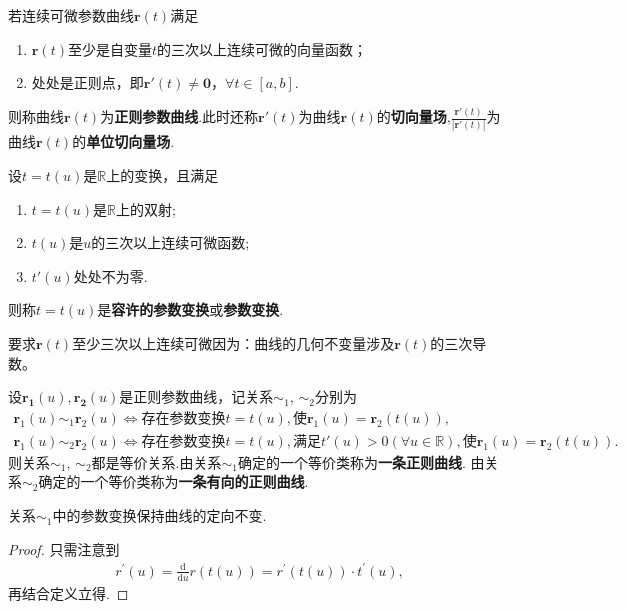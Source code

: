 \documentclass[../../main.tex]{subfiles}%
\begin{document}
\begin{definition}[正则参数曲线和参数变换]
若连续可微参数曲线$\bm{r}(t)$满足
\begin{enumerate}[(1)]
\item $\bm{r}(t)$至少是自变量$t$的三次以上连续可微的向量函数；

\item 处处是正则点，即$\bm{r}'(t)\neq \bm{0}$，$\forall t\in[a,b]$.
\end{enumerate}
则称曲线$\bm{r}(t)$为\textbf{正则参数曲线}.此时还称$\bm{r}'(t)$为曲线$\bm{r}(t)$的\textbf{切向量场},$\frac{\bm{r}'(t)}{|\bm{r}'(t)|}$为曲线$\bm{r}(t)$的\textbf{单位切向量场}.

设$t=t(u)$是$\mathbb{R}$上的变换，且满足
\begin{enumerate}[(1)]
\item $t=t(u)$是$\mathbb{R}$上的双射;

\item $t(u)$是$u$的三次以上连续可微函数;

\item $t'(u)$处处不为零.
\end{enumerate}
则称$t=t(u)$是\textbf{容许的参数变换}或\textbf{参数变换}.
\end{definition}
\begin{remark}
要求$\bm{r}(t)$至少三次以上连续可微因为：曲线的几何不变量涉及$\bm{r}(t)$的三次导数。
\end{remark}

\begin{theorem}
设$\bm{r_1}(u),\bm{r_2}(u)$是正则参数曲线，记关系$\sim_1,\,\sim_2$分别为
\begin{gather*}
\boldsymbol{r}_1(u)\sim_1 \boldsymbol{r}_2(u)\Longleftrightarrow \text{存在参数变换}t=t\left( u \right) ,\text{使}\boldsymbol{r}_1\left( u \right) =\boldsymbol{r}_2\left( t\left( u \right) \right),
\\
\boldsymbol{r}_1(u)\sim_2 \boldsymbol{r}_2(u)\Longleftrightarrow \text{存在参数变换}t=t\left( u \right) ,\text{满足}t\prime \left( u \right) >0\left( \forall u\in \mathbb{R} \right) ,\text{使}\boldsymbol{r}_1\left( u \right) =\boldsymbol{r}_2\left( t\left( u \right) \right) .
\end{gather*}
则关系$\sim_1,\,\sim_2$都是等价关系.由关系$\sim_1$确定的一个等价类称为\textbf{一条正则曲线}.
由关系$\sim_2$确定的一个等价类称为\textbf{一条有向的正则曲线}.
\end{theorem}
\begin{note}
关系$\sim_1$中的参数变换保持曲线的定向不变.
\end{note}
\begin{proof}

只需注意到
\begin{align*}
r^{\prime}\left( u \right) =\frac{\mathrm{d}}{\mathrm{d}u}r\left( t\left( u \right) \right) =r^{\prime}\left( t\left( u \right) \right) \cdot t^{\prime}\left( u \right) ,
\end{align*}
再结合定义立得.

\end{proof}
\end{document}
